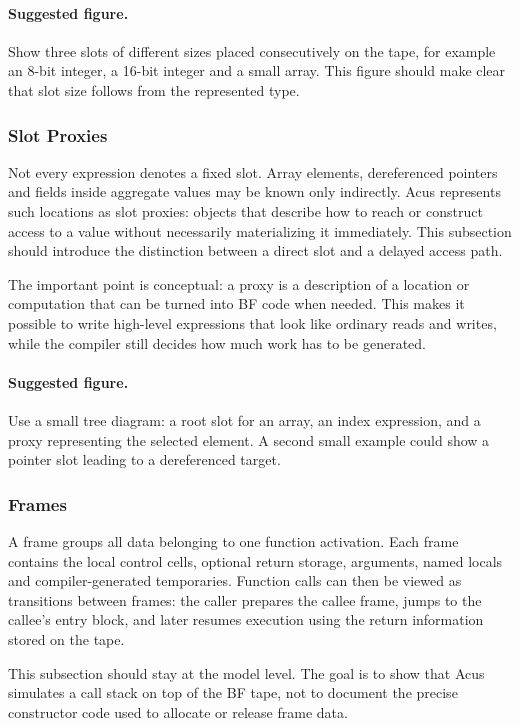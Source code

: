 \paragraph{Suggested figure.}
Show three slots of different sizes placed consecutively on the tape, for example an 8-bit integer, a 16-bit integer and a small array. This figure should make clear that slot size follows from the represented type.

\subsubsection{Slot Proxies}
Not every expression denotes a fixed slot. Array elements, dereferenced pointers and fields inside aggregate values may be known only indirectly. Acus represents such locations as slot proxies: objects that describe how to reach or construct access to a value without necessarily materializing it immediately. This subsection should introduce the distinction between a direct slot and a delayed access path.

The important point is conceptual: a proxy is a description of a location or computation that can be turned into BF code when needed. This makes it possible to write high-level expressions that look like ordinary reads and writes, while the compiler still decides how much work has to be generated.

\paragraph{Suggested figure.}
Use a small tree diagram: a root slot for an array, an index expression, and a proxy representing the selected element. A second small example could show a pointer slot leading to a dereferenced target.

\subsubsection{Frames}
A frame groups all data belonging to one function activation. Each frame contains the local control cells, optional return storage, arguments, named locals and compiler-generated temporaries. Function calls can then be viewed as transitions between frames: the caller prepares the callee frame, jumps to the callee's entry block, and later resumes execution using the return information stored on the tape.

This subsection should stay at the model level. The goal is to show that Acus simulates a call stack on top of the BF tape, not to document the precise constructor code used to allocate or release frame data.

